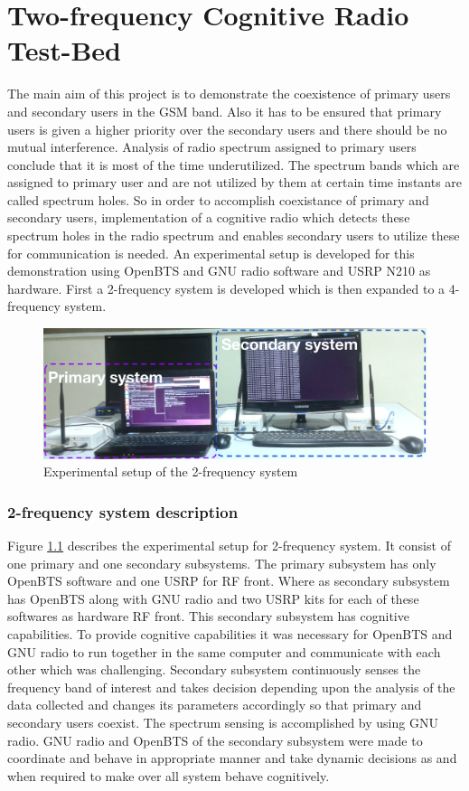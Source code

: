 \chapter{Two-frequency Cognitive Radio Test-Bed}
The main aim of this project is to demonstrate the coexistence of 
primary users and secondary users in the GSM band. Also it has to be
ensured that primary users is given a higher priority over the 
secondary users and there should be no mutual interference. Analysis 
of radio spectrum assigned to primary users conclude that it is most of the time underutilized. 
The spectrum bands which are assigned to primary user and are not utilized by
them at certain time instants are called spectrum holes. 
So in order to accomplish coexistance of primary and secondary users, 
implementation of a cognitive radio which detects these spectrum holes in the 
radio spectrum and enables secondary users to utilize these for communication 
is needed. An experimental setup is developed for this demonstration using 
OpenBTS and GNU radio software and USRP N210 as hardware. First a 2-frequency 
system is developed which is then expanded to a 4-frequency system.



\begin{figure}
\centering
\includegraphics[width=1\textwidth]{../images/freq2}
\caption[Experimental setup, 2-frequency system]{Experimental setup of the 
2-frequency system}
\label{freq2}
\end{figure}


\subsection{2-frequency system description}
Figure \ref{freq2} describes the experimental setup for 2-frequency system. It 
consist of one primary and one secondary subsystems. The primary subsystem has 
only OpenBTS software and one USRP for RF front. Where as secondary subsystem 
has OpenBTS along with GNU radio and two USRP kits for each of these softwares 
as hardware RF front. This secondary subsystem has cognitive capabilities. To 
provide cognitive capabilities it was necessary for OpenBTS and GNU radio to run 
together in the same computer and communicate with each other which was challenging. 
Secondary subsystem continuously senses the frequency band of interest and  
takes decision depending upon the analysis of the data collected and changes 
its parameters accordingly so that primary and secondary users coexist. The 
spectrum sensing is accomplished by using GNU radio.  GNU radio and 
OpenBTS of the secondary subsystem were made to coordinate and behave in appropriate manner and take dynamic decisions 
as and when required to make over all system behave cognitively.

